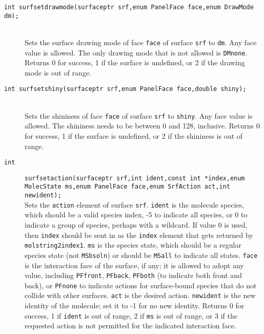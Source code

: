 \documentclass {book}
\begin{document}
\begin{description}
\item[\texttt{int surfsetdrawmode(surfaceptr srf,enum PanelFace face,enum DrawMode dm);}]
\hfill \\
Sets the surface drawing mode of face \texttt{face} of surface \texttt{srf} to \texttt{dm}.  Any face value is allowed.  The only drawing mode that is not allowed is \texttt{DMnone}.  Returns 0 for success, 1 if the surface is undefined, or 2 if the drawing mode is out of range.

\item[\texttt{int surfsetshiny(surfaceptr srf,enum PanelFace face,double shiny);}]
\hfill \\
Sets the shininess of face \texttt{face} of surface \texttt{srf} to \texttt{shiny}.  Any face value is allowed.  The shininess needs to be between 0 and 128, inclusive.  Returns 0 for success, 1 if the surface is undefined, or 2 if the shininess is out of range.

\item[\texttt{int}]
\texttt{surfsetaction(surfaceptr srf,int ident,const int *index,enum MolecState ms,enum PanelFace face,enum SrfAction act,int newident);}
\hfill \\
Sets the \texttt{action} element of surface \texttt{srf}.  \texttt{ident} is the molecule species, which should be a valid species index, -5 to indicate all species, or 0 to indicate a group of species, perhaps with a wildcard.  If value 0 is used, then \texttt{index} should be sent in as the \texttt{index} element that gets returned by \texttt{molstring2index1}.  \texttt{ms} is the species state, which should be a regular species state (not \texttt{MSbsoln}) or should be \texttt{MSall} to indicate all states.  \texttt{face} is the interaction face of the surface, if any; it is allowed to adopt any value, including \texttt{PFfront}, \texttt{PFback}, \texttt{PFboth} (to indicate both front and back), or \texttt{PFnone} to indicate actions for surface-bound species that do not collide with other surfaces.  \texttt{act} is the desired action. \texttt{newident} is the new identity of the molecule; set it to -1 for no new identity.  Returns 0 for success, 1 if \texttt{ident} is out of range, 2 if \texttt{ms} is out of range, or 3 if the requested action is not permitted for the indicated interaction face.


\end{description}
\end{document}
